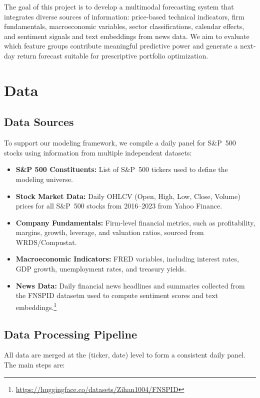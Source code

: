 \documentclass[11pt]{article}
\begin{document}
\noindent The goal of this project is to develop a multimodal forecasting system that integrates diverse sources of information: price-based technical indicators, firm fundamentals, macroeconomic variables, sector classifications, calendar effects, and sentiment signals and text embeddings from news data. 
We aim to evaluate which feature groups contribute meaningful predictive power and generate a next-day return forecast suitable for prescriptive portfolio optimization.

\section{Data}

\subsection{Data Sources}
To support our modeling framework, we compile a daily panel for S\&P~500 stocks using information from multiple independent datasets:
\begin{itemize}
    \item \textbf{S\&P 500 Constituents:}  
    List of S\&P~500 tickers used to define the modeling universe.

    \item \textbf{Stock Market Data:}  
    Daily OHLCV (Open, High, Low, Close, Volume) prices for all S\&P~500 stocks from 2016--2023 from Yahoo Finance.

    \item \textbf{Company Fundamentals:}  
    Firm-level financial metrics, such as profitability, margins, growth, leverage, and valuation ratios, sourced from WRDS/Compustat.

    \item \textbf{Macroeconomic Indicators:}  
    FRED variables, including interest rates, GDP growth, unemployment rates, and treasury yields. 

    \item \textbf{News Data:}  
    Daily financial news headlines and summaries collected from the FNSPID datasetm used to compute sentiment scores and text embeddings.\footnote{\url{https://huggingface.co/datasets/Zihan1004/FNSPID}}
\end{itemize}

\subsection{Data Processing Pipeline}
All data are merged at the (ticker, date) level to form a consistent daily panel. The main steps are:
\end{document}
